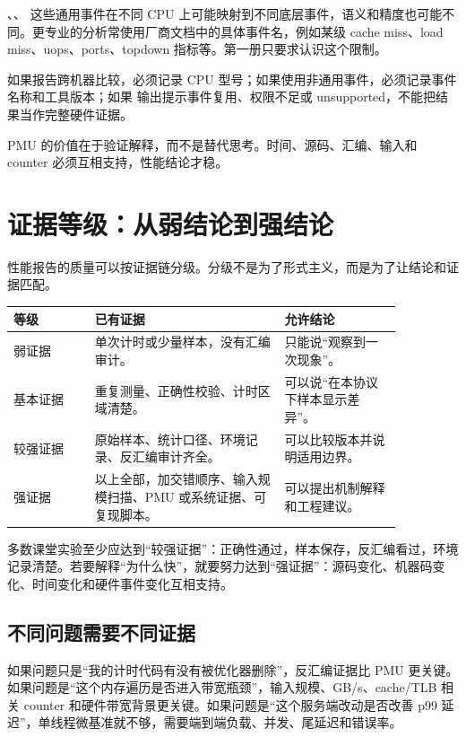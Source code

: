 、、 这些通用事件在不同 CPU 上可能映射到不同底层事件，语义和精度也可能不同。更专业的分析常使用厂商文档中的具体事件名，例如某级 cache miss、load miss、uops、ports、topdown 指标等。第一册只要求认识这个限制。

如果报告跨机器比较，必须记录 CPU 型号；如果使用非通用事件，必须记录事件名称和工具版本；如果  输出提示事件复用、权限不足或 unsupported，不能把结果当作完整硬件证据。

\begin{keyidea}
PMU 的价值在于验证解释，而不是替代思考。时间、源码、汇编、输入和 counter 必须互相支持，性能结论才稳。
\end{keyidea}

\section{证据等级：从弱结论到强结论}

性能报告的质量可以按证据链分级。分级不是为了形式主义，而是为了让结论和证据匹配。

\begin{center}
\begin{tabular}{p{0.18\linewidth}p{0.42\linewidth}p{0.26\linewidth}}
\toprule
等级 & 已有证据 & 允许结论 \\
\midrule
弱证据 & 单次计时或少量样本，没有汇编审计。 & 只能说“观察到一次现象”。 \\
基本证据 & 重复测量、正确性校验、计时区域清楚。 & 可以说“在本协议下样本显示差异”。 \\
较强证据 & 原始样本、统计口径、环境记录、反汇编审计齐全。 & 可以比较版本并说明适用边界。 \\
强证据 & 以上全部，加交错顺序、输入规模扫描、PMU 或系统证据、可复现脚本。 & 可以提出机制解释和工程建议。 \\
\bottomrule
\end{tabular}
\end{center}

多数课堂实验至少应达到“较强证据”：正确性通过，样本保存，反汇编看过，环境记录清楚。若要解释“为什么快”，就要努力达到“强证据”：源码变化、机器码变化、时间变化和硬件事件变化互相支持。

\subsection{不同问题需要不同证据}

如果问题只是“我的计时代码有没有被优化器删除”，反汇编证据比 PMU 更关键。如果问题是“这个内存遍历是否进入带宽瓶颈”，输入规模、GB/s、cache/TLB 相关 counter 和硬件带宽背景更关键。如果问题是“这个服务端改动是否改善 p99 延迟”，单线程微基准就不够，需要端到端负载、并发、尾延迟和错误率。

